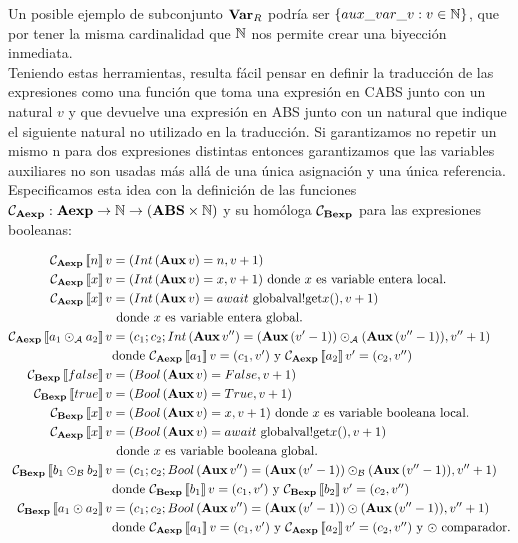 Un posible ejemplo de subconjunto $\textbf{Var}_R$ podría ser $\{aux\_var\_v: v \in \mathbb{N}\}$, que por tener la misma cardinalidad que $\mathbb{N}$ nos permite crear una biyección inmediata.\\

Teniendo estas herramientas, resulta fácil pensar en definir la traducción de las expresiones como una función que toma una expresión en CABS junto con un natural $v$ y que devuelve una expresión en ABS junto con un natural que indique el siguiente natural no utilizado en la traducción. Si garantizamos no repetir un mismo n para dos expresiones distintas entonces garantizamos que las variables auxiliares no son usadas más allá de una única asignación y una única referencia.\\

Especificamos esta idea con la definición de las funciones $\mathcal{C}_{\textbf{Aexp}}: \textbf{Aexp} \rightarrow \mathbb{N} \rightarrow (\textbf{ABS} \times \mathbb{N})$ y su homóloga  $\mathcal{C}_{\textbf{Bexp}}$ para las expresiones booleanas:

\begin{align*}
  \mathcal{C}_{\textbf{Aexp}}\left\llbracket n \right\rrbracket v &= (Int\, (\textbf{Aux}\, v) = n, v + 1) \\
  \mathcal{C}_{\textbf{Aexp}}\left\llbracket x \right\rrbracket v &= (Int\, (\textbf{Aux}\, v) = x, v + 1) \mbox{ donde $x$ es variable entera local.} \\
  \mathcal{C}_{\textbf{Aexp}}\left\llbracket x \right\rrbracket v &= (Int\, (\textbf{Aux}\, v) = await \mbox{ globalval!get}x(), v + 1) \\
  &\mbox{ donde $x$ es variable entera global.} \\
  \mathcal{C}_{\textbf{Aexp}}\left\llbracket a_1 \odot_{\mathcal{A}} a_2 \right\rrbracket v &= (c_1\mbox{;\,} c_2 \mbox{;\,} Int\, (\textbf{Aux}\, v'') =  (\textbf{Aux}\, (v' - 1))  \odot_{\mathcal{A}}  (\textbf{Aux}\, (v'' - 1)) , v'' + 1) \\
  &\mbox{donde $\mathcal{C}_{\textbf{Aexp}}\left\llbracket a_1 \right\rrbracket v = (c_1, v')$ y $\mathcal{C}_{\textbf{Aexp}}\left\llbracket a_2 \right\rrbracket v' = (c_2, v'')$} \\
  \mathcal{C}_{\textbf{Bexp}}\left\llbracket false \right\rrbracket v &= (Bool\, (\textbf{Aux}\, v) = False, v + 1) \\
  \mathcal{C}_{\textbf{Bexp}}\left\llbracket true \right\rrbracket v &= (Bool\, (\textbf{Aux}\, v) = True, v + 1) \\
  \mathcal{C}_{\textbf{Bexp}}\left\llbracket x \right\rrbracket v &= (Bool\, (\textbf{Aux}\, v) = x, v + 1) \mbox{ donde $x$ es variable booleana local.} \\
  \mathcal{C}_{\textbf{Aexp}}\left\llbracket x \right\rrbracket v &= (Bool\, (\textbf{Aux}\, v) = await \mbox{ globalval!get}x(), v + 1) \\
  &\mbox{ donde $x$ es variable booleana global.} \\
  \mathcal{C}_{\textbf{Bexp}}\left\llbracket b_1 \odot_{\mathcal{B}} b_2 \right\rrbracket v &= (c_1\mbox{;\,} c_2 \mbox{;\,} Bool\, (\textbf{Aux}\, v'') =  (\textbf{Aux}\, (v' - 1))  \odot_{\mathcal{B}}  (\textbf{Aux}\, (v'' - 1)) , v'' + 1) \\
  &\mbox{donde $\mathcal{C}_{\textbf{Bexp}}\left\llbracket b_1 \right\rrbracket v = (c_1, v')$ y $\mathcal{C}_{\textbf{Bexp}}\left\llbracket b_2 \right\rrbracket v' = (c_2, v'')$} \\
  \mathcal{C}_{\textbf{Bexp}}\left\llbracket a_1 \odot a_2 \right\rrbracket v &= (c_1\mbox{;\,} c_2 \mbox{;\,} Bool\, (\textbf{Aux}\, v'') =  (\textbf{Aux}\, (v' - 1))  \odot  (\textbf{Aux}\, (v'' - 1)) , v'' + 1) \\
  &\mbox{donde $\mathcal{C}_{\textbf{Aexp}}\left\llbracket a_1 \right\rrbracket v = (c_1, v')$ y $\mathcal{C}_{\textbf{Aexp}}\left\llbracket a_2 \right\rrbracket v' = (c_2, v'')$ y $\odot$ comparador.} \\
\end{align*}

